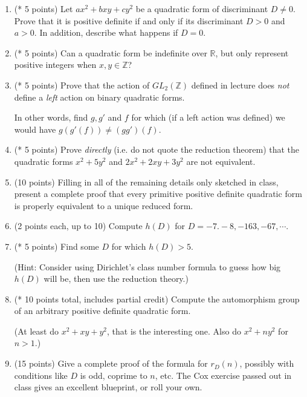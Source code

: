 \documentclass[12pt]{article}
\begin{document}
\begin{enumerate}
\item (* 5 points)
Let $ax^2 + bxy + cy^2$ be a quadratic form of discriminant $D \neq 0$. Prove that it is positive definite if and only if its discriminant
$D > 0$ and $a > 0$. In addition, describe what happens if $D = 0$.

\item (* 5 points)
Can a quadratic form be indefinite over $\mathbb{R}$, but only represent positive integers when $x, y \in \mathbb{Z}$?

\item (* 5 points)
Prove that the action of $GL_2(\mathbb{Z})$ defined in lecture does {\itshape not} define a {\itshape left} action
on binary quadratic forms. 

In other words, find $g, g'$ and $f$ for which (if a left action was defined) we would have
$g(g'(f)) \neq (gg')(f)$.

\item (* 5 points)
Prove {\itshape directly} (i.e. do not quote the reduction theorem) that the quadratic forms
$x^2 + 5y^2$ and $2x^2 + 2xy + 3y^2$ are not equivalent.

\item (10 points)
Filling in all of the remaining details only sketched in class, 
present a complete proof that every primitive positive definite
quadratic form is properly equivalent to a unique reduced form.

\item (2 points each, up to 10)
Compute $h(D)$ for $D = -7. -8, -163, -67, \cdots$.

\item (* 5 points)
Find some $D$ for which $h(D) > 5$.

(Hint: Consider using Dirichlet's class number formula to guess how big $h(D)$ will be, then use the reduction theory.)

\item (* 10 points total, includes partial credit)
Compute the automorphism group of an arbitrary positive definite quadratic form.

(At least do $x^2 + xy + y^2$, that is the interesting one. Also do $x^2 + n y^2$ for $n > 1$.)

\item (15 points)
Give a complete proof of the formula for $r_D(n)$, possibly with conditions like $D$ is odd, coprime to $n$, etc.
The Cox exercise passed out in class gives an excellent blueprint, or roll your own.


\end{enumerate}
\end{document}
